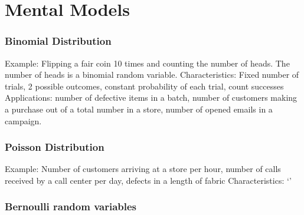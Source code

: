 \section*{Mental Models}
\subsubsection*{Binomial Distribution}
Example: Flipping a fair coin 10 times and counting the number of heads. The number of heads is a binomial random variable.
Characteristics: Fixed number of trials, 2 possible outcomes, constant probability of each trial, count successes
Applications: number of defective items in a batch, number of customers making a purchase out of a total number in a store, number of opened emails in a campaign.

\subsubsection*{Poisson Distribution}
Example: Number of customers arriving at a store per hour, number of calls received by a call center per day, defects in a length of fabric
Characteristics: `'

\subsubsection*{Bernoulli random variables}